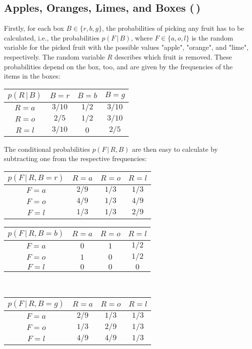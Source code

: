 \documentclass[11pt, a4paper]{scrartcl}
\newcommand{\given}{\,\vert\,}
\newcommand{\diffstar}{\texorpdfstring{\raisebox{-1pt}{\resizebox{!}{8pt}{\(\star\)}}}{*}}
\newcommand{\twostar}  {(\diffstar\,\diffstar)}
\begin{document}
		\subsection{Apples, Oranges, Limes, and Boxes  \twostar}
			Firstly, for each box \( B \in \{ r, b, g \} \), the probabilities of picking any fruit has to be calculated, i.e., the probabilities \( p(F \given B) \), where \( F \in \{ a, o, l \} \) is the random variable for the picked fruit with the possible values "apple", "orange", and "lime", respectively. The random variable \( R \) describes which fruit is removed. These probabilities depend on the box, too, and are given by the frequencies of the items in the boxes:
			\begin{center}
				\begin{tabular}{c|ccc}
					\( p(R \given B) \) & \(B = r\) & \(B = b\) & \(B = g\) \\ \hline
					     \(R = a\)      & \(3/10\)  &  \(1/2\)  & \(3/10\)  \\
					     \(R = o\)      &  \(2/5\)  &  \(1/2\)  & \(3/10\)  \\
					     \(R = l\)      & \(3/10\)  &   \(0\)   &  \(2/5\)
				\end{tabular}
			\end{center}
			The conditional probabilities \( p(F \given R, B) \) are then easy to calculate by subtracting one from the respective frequencies:
			\begin{center}
				\begin{tabular}{c|ccc}
					\( p(F \given R, B = r) \) & \(R = a\) & \(R = o\) & \(R = l\) \\ \hline
					        \(F = a\)          &  \(2/9\)  &  \(1/3\)  &  \(1/3\)  \\
					        \(F = o\)          &  \(4/9\)  &  \(1/3\)  &  \(4/9\)  \\
					        \(F = l\)          &  \(1/3\)  &  \(1/3\)  &  \(2/9\)
				\end{tabular}
				\qquad
				\begin{tabular}{c|ccc}
					\( p(F \given R, B = b) \) & \(R = a\) & \(R = o\) & \(R = l\) \\ \hline
					        \(F = a\)          &   \(0\)   &   \(1\)   &  \(1/2\)  \\
					        \(F = o\)          &   \(1\)   &   \(0\)   &  \(1/2\)  \\
					        \(F = l\)          &   \(0\)   &   \(0\)   &   \(0\)
				\end{tabular} \\
				\vspace{0.5cm}
				\begin{tabular}{c|ccc}
					\( p(F \given R, B = g) \) & \(R = a\) & \(R = o\) & \(R = l\) \\ \hline
					        \(F = a\)          &  \(2/9\)  &  \(1/3\)  &  \(1/3\)  \\
					        \(F = o\)          &  \(1/3\)  &  \(2/9\)  &  \(1/3\)  \\
					        \(F = l\)          &  \(4/9\)  &  \(4/9\)  &  \(1/3\)
				\end{tabular}
			\end{center}
\end{document}
